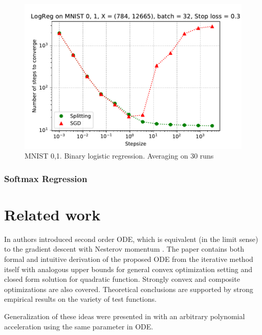 \documentclass{article}
\begin{document}
\begin{figure}[ht]
\vskip 0.2in
\begin{center}
\centerline{\includegraphics[width=\columnwidth]{sgd_split_time_logreg.pdf}}
\caption{MNIST 0,1. Binary logistic regression. Averaging on 30 runs}
\label{strang:fig:logreg_step_time}
\end{center}
\vskip -0.2in
\end{figure}

\subsubsection{Softmax Regression}


\section{Related work}

In \cite{su2014differential} authors introduced second order ODE, which is equivalent (in the limit sense) to the gradient descent with Nesterov momentum \cite{nesterov1983method}. The paper contains both formal and intuitive derivation of the proposed ODE from the iterative method itself with analogous upper bounds for general convex optimization setting and closed form solution for quadratic function. Strongly convex and composite optimizations are also covered. Theoretical conclusions are supported by strong empirical results on the variety of test functions.

Generalization of these ideas were presented in \cite{wibisono2016variational} with an arbitrary polynomial acceleration using the same parameter in ODE.
\end{document}
